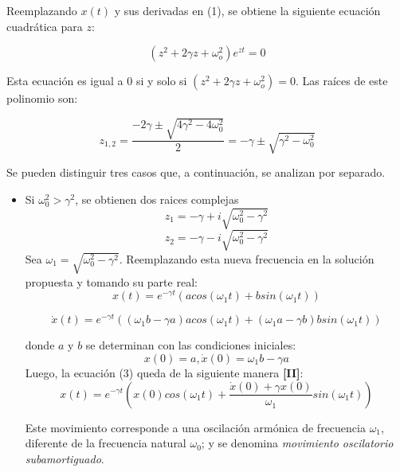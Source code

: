 \documentclass[a4paper,12pt]{article}
\begin{document}
Reemplazando $x(t)$ y sus derivadas en (1), se obtiene la siguiente ecuaci\'on cuadr\'atica para $z$:

$$
(z^2 + 2\gamma z + \omega_o^2)e^{zt}=0
$$

Esta ecuaci\'on es igual a 0 si y solo si $(z^2 + 2\gamma z + \omega_o^2) = 0$. Las ra\'ices de este polinomio son:

$$
z_{1,2} = \frac{-2\gamma \pm \sqrt{4\gamma^2 - 4\omega_0^2}}{2} = -\gamma \pm \sqrt{\gamma^2 - \omega_0^2}
$$

Se pueden distinguir tres casos que, a continuaci\'on, se analizan por separado.

\begin{itemize}
\item Si $\omega_0^2 > \gamma^2$, se obtienen dos raices complejas
$$z_{1} = -\gamma + i\sqrt{\omega_0^2 - \gamma^2}$$  $$z_{2} = -\gamma - i\sqrt{\omega_0^2 - \gamma^2}$$
Sea $\omega_{1} = \sqrt{\omega_0^2 - \gamma^2}$. Reemplazando esta nueva frecuencia en la soluci\'on propuesta y tomando su parte real:
\begin{equation}
x(t) = e^{-\gamma t}(acos(\omega_{1}t) + bsin(\omega_{1}t))
\end{equation}

$$\dot{x}(t) = e^{-\gamma t}((\omega_{1}b - \gamma a)acos(\omega_{1}t) + (\omega_{1}a - \gamma b)bsin(\omega_{1}t))$$

donde $a$ y $b$ se determinan con las condiciones iniciales:
$$ x(0) = a, \dot{x}(0) = \omega_{1}b - \gamma a$$
Luego, la ecuaci\'on (3) queda de la siguiente manera \textbf{[II]}:
\begin{equation}
x(t) = e^{-\gamma t}(x(0)cos(\omega_{1}t) + \frac{\dot{x}(0) + \gamma x(0)}{\omega_{1}}sin(\omega_{1}t))
\end{equation}

Este movimiento corresponde a una oscilaci\'on arm\'onica de frecuencia $\omega_{1}$, diferente de la frecuencia natural $\omega_{0}$; y se denomina \textit{movimiento oscilatorio subamortiguado}.


\end{itemize}
\end{document}
